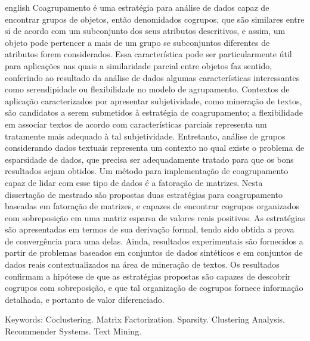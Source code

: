 \documentclass[
    12pt,                %
    oneside,            %
    a4paper,            %
    english,            %
    brazil                %
    ]{abntex2ppgsi}
\begin{document}
\begin{resumo}[Abstract]
\begin{otherlanguage*}{english}
Coagrupamento é uma estratégia para análise de dados capaz de encontrar grupos de objetos, então denomidados cogrupos, que são similares entre si de acordo com um subconjunto dos seus atributos descritivos, e assim, um objeto pode pertencer a mais de um grupo se subconjuntos diferentes de atributos forem considerados. Essa característica pode ser particularmente útil para aplicações nas quais a similaridade parcial entre objetos faz sentido, conferindo ao resultado da análise de dados algumas características interessantes como serendipidade ou flexibilidade no modelo de agrupamento. Contextos de aplicação caracterizados por apresentar subjetividade, como mineração de textos, são candidatos a serem submetidos à estratégia de coagrupamento; a flexibilidade em associar textos de acordo com características parciais representa um tratamente mais adequado à tal subjetividade. Entretanto, análise de grupos considerando dados textuais representa um contexto no qual existe o problema de esparsidade de dados, que precisa ser adequadamente tratado para que os bons resultados sejam obtidos. Um método para implementação de coagrupamento capaz de lidar com esse tipo de dados é a fatoração de matrizes. Nesta dissertação de mestrado são propostas duas estratégias para coagrupamento baseadas em fatoração de matrizes, e capazes de encontrar cogrupos organizados com sobreposição em uma matriz esparsa de valores reais positivos. As estratégias são apresentadas em termos de sua derivação formal, tendo sido obtida a prova de convergência para uma delas. Ainda, resultados experimentais são fornecidos a partir de problemas baseados em conjuntos de dados sintéticos e em conjuntos de dados reais contextualizados na área de mineração de textos. Os resultados confirmam a hipótese de que as estratégias propostas são capazes de descobrir cogrupos com sobreposição, e que tal organização de cogrupos fornece informação detalhada, e portanto de valor diferenciado.


Keywords: Coclustering. Matrix Factorization. Sparsity. Clustering Analysis. Recommender Systems. Text Mining.
\end{otherlanguage*}
\end{resumo}

\listoffigures*
\cleardoublepage

\listofalgorithms
\cleardoublepage
\end{document}
